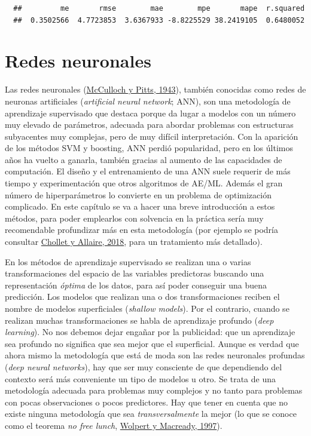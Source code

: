 \documentclass[
]{book}
\theoremstyle{break}
\theoremstyle{nonumberplain}
\begin{document}
\begin{verbatim}
  ##         me       rmse        mae        mpe       mape  r.squared 
  ##  0.3502566  4.7723853  3.6367933 -8.8225529 38.2419105  0.6480052
\end{verbatim}

\hypertarget{neural-nets}{%
\chapter{Redes neuronales}\label{neural-nets}}

Las redes neuronales (\protect\hyperlink{ref-mcculloch1943logical}{McCulloch y Pitts, 1943}), también conocidas como redes de neuronas artificiales (\emph{artificial neural network}; ANN), son una metodología de aprendizaje supervisado que destaca porque da lugar a modelos con un número muy elevado de parámetros, adecuada para abordar problemas con estructuras subyacentes muy complejas, pero de muy difícil interpretación.
Con la aparición de los métodos SVM y boosting, ANN perdió popularidad, pero en los últimos años ha vuelto a ganarla, también gracias al aumento de las capacidades de computación.
El diseño y el entrenamiento de una ANN suele requerir de más tiempo y experimentación que otros algoritmos de AE/ML.
Además el gran número de hiperparámetros lo convierte en un problema de optimización complicado.
En este capítulo se va a hacer una breve introducción a estos métodos, para poder emplearlos con solvencia en la práctica sería muy recomendable profundizar más en esta metodología (por ejemplo se podría consultar \protect\hyperlink{ref-chollet2018deep}{Chollet y Allaire, 2018}, para un tratamiento más detallado).

En los métodos de aprendizaje supervisado se realizan una o varias transformaciones del espacio de las variables predictoras buscando una representación \emph{óptima} de los datos, para así poder conseguir una buena predicción.
Los modelos que realizan una o dos transformaciones reciben el nombre de modelos superficiales (\emph{shallow models}).
Por el contrario, cuando se realizan muchas transformaciones se habla de aprendizaje profundo (\emph{deep learning}).
No nos debemos dejar engañar por la publicidad: que un aprendizaje sea profundo no significa que sea mejor que el superficial.
Aunque es verdad que ahora mismo la metodología que está de moda son las redes neuronales profundas (\emph{deep neural networks}), hay que ser muy consciente de que dependiendo del contexto será más conveniente un tipo de modelos u otro.
Se trata de una metodología adecuada para problemas muy complejos y no tanto para problemas con pocas observaciones o pocos predictores.
Hay que tener en cuenta que no existe ninguna metodología que sea \emph{transversalmente} la mejor (lo que se conoce como el teorema \emph{no free lunch}, \protect\hyperlink{ref-wolpert1997no}{Wolpert y Macready, 1997}).
\end{document}
